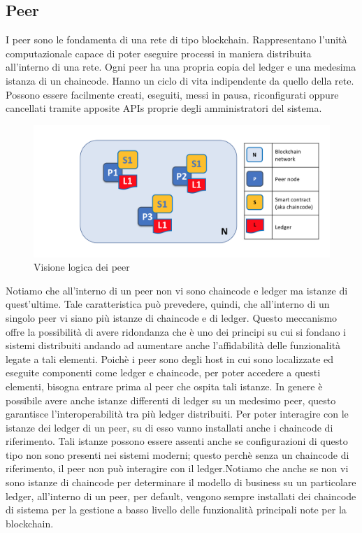 \subsection{Peer}
I peer sono le fondamenta di una rete di tipo blockchain. Rappresentano l'unità computazionale capace di poter eseguire processi in maniera distribuita all'interno di una rete. Ogni peer ha una propria copia del ledger e una medesima istanza di un chaincode. Hanno un ciclo di vita indipendente da quello della rete. Possono essere facilmente creati, eseguiti, messi in pausa, riconfigurati oppure cancellati tramite apposite APIs proprie degli amministratori del sistema.
\begin{figure}[h]
    \centering
    \includegraphics[width=1\textwidth]{img/peer-diagram.png}
    \caption{Visione logica dei peer}
    \label{fig:peer-diagram}
\end{figure}
Notiamo che all'interno di un peer non vi sono chaincode e ledger ma istanze di quest'ultime. Tale caratteristica può prevedere, quindi, che all'interno di un singolo peer vi siano più istanze di chaincode e di ledger. Questo meccanismo offre la possibilità di avere ridondanza che è uno dei principi su cui si fondano i sistemi distribuiti andando ad aumentare anche l'affidabilità delle funzionalità legate a tali elementi. Poichè i peer sono degli host in cui sono localizzate ed eseguite componenti come ledger e chaincode, per poter accedere a questi elementi, bisogna entrare prima al peer che ospita tali istanze. In genere è possibile avere anche istanze differenti di ledger su un medesimo peer, questo garantisce l'interoperabilità tra più ledger distribuiti. Per poter interagire con le istanze dei ledger di un peer, su di esso vanno installati anche i chaincode di riferimento. Tali istanze possono essere assenti anche se configurazioni di questo tipo non sono presenti nei sistemi moderni; questo perchè senza un chaincode di riferimento, il peer non può interagire con il ledger.Notiamo che anche se non vi sono istanze di chaincode per determinare il modello di business su un particolare ledger, all'interno di un peer, per default, vengono sempre installati dei chaincode di sistema per la gestione a basso livello delle funzionalità principali note per la blockchain.
